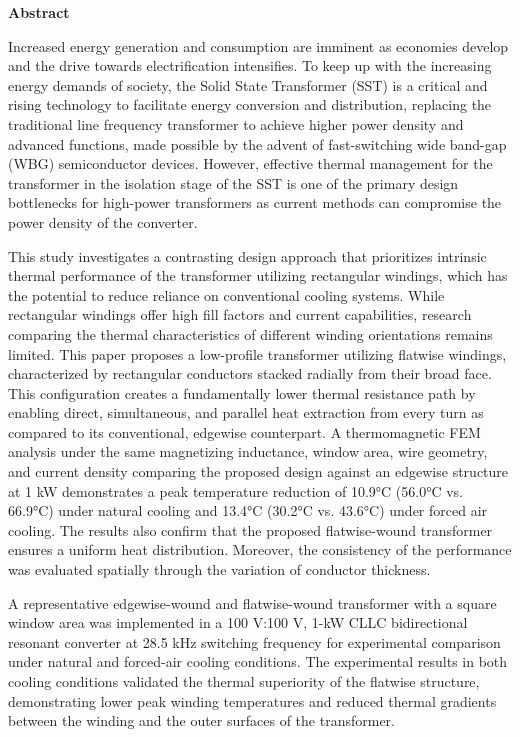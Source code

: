\fancyhf{} %
\fancyhead[RO,R]{\thepage} %
\renewcommand{\headrulewidth}{0pt}

\begin{center}
    \LARGE
    \textbf{Abstract}
\end{center}
\doublespacing
\par Increased energy generation and consumption are imminent as economies develop and the drive towards electrification intensifies. To keep up with the increasing energy demands of society, the Solid State Transformer (SST) is a critical and rising technology to facilitate energy conversion and distribution, replacing the traditional line frequency transformer to achieve higher power density and advanced functions, made possible by the advent of fast-switching wide band-gap (WBG) semiconductor devices. However, effective thermal management for the transformer in the isolation stage of the SST is one of the primary design bottlenecks for high-power transformers as current methods can compromise the power density of the converter. 
\par This study investigates a contrasting design approach that prioritizes intrinsic thermal performance of the transformer utilizing rectangular windings, which has the potential to reduce reliance on conventional cooling systems. While rectangular windings offer high fill factors and current capabilities, research comparing the thermal characteristics of different winding orientations remains limited. This paper proposes a low-profile transformer utilizing flatwise windings, characterized by rectangular conductors stacked radially from their broad face. This configuration creates a fundamentally lower thermal resistance path by enabling direct, simultaneous, and parallel heat extraction from every turn as compared to its conventional, edgewise counterpart. A thermomagnetic FEM analysis under the same magnetizing inductance, window area, wire geometry, and current density comparing the proposed design against an edgewise structure at 1 kW demonstrates a peak temperature reduction of 10.9°C (56.0°C vs. 66.9°C) under natural cooling and 13.4°C (30.2°C vs. 43.6°C) under forced air cooling. The results also confirm that the proposed flatwise-wound transformer ensures a uniform heat distribution. Moreover, the consistency of the performance was evaluated spatially through the variation of conductor thickness.
\par A representative edgewise-wound and flatwise-wound transformer with a square window area was implemented in a 100 V:100 V, 1-kW CLLC bidirectional resonant converter at 28.5 kHz switching frequency for experimental comparison under natural and forced-air cooling conditions. The experimental results in both cooling conditions validated the thermal superiority of the flatwise structure, demonstrating lower peak winding temperatures and reduced thermal gradients between the winding and the outer surfaces of the transformer. 
